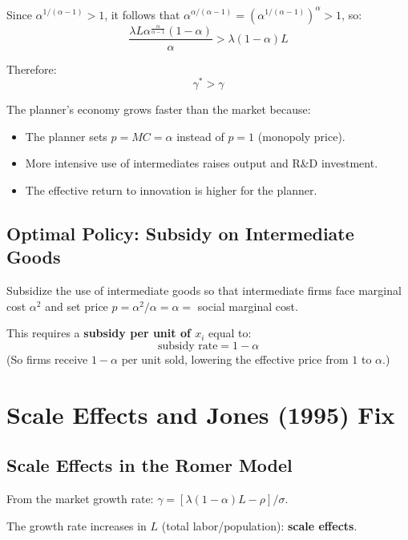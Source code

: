 \documentclass[a4paper,11pt]{article}
\begin{document}
Since $\alpha^{1/(\alpha-1)} > 1$, it follows that $\alpha^{\alpha/(\alpha-1)} = (\alpha^{1/(\alpha-1)})^\alpha > 1$, so:
\[
\frac{\lambda L \alpha^{\frac{\alpha}{\alpha-1}}(1-\alpha)}{\alpha} > \lambda(1-\alpha)L
\]

Therefore:
\[
\gamma^* > \gamma
\]

The planner's economy grows faster than the market because:
\begin{itemize}
    \item The planner sets $p = MC = \alpha$ instead of $p = 1$ (monopoly price).
    \item More intensive use of intermediates raises output and R\&D investment.
    \item The effective return to innovation is higher for the planner.
\end{itemize}

\subsection*{Optimal Policy: Subsidy on Intermediate Goods}

\begin{keyformulabox}
Subsidize the use of intermediate goods so that intermediate firms face marginal cost $\alpha^2$ and set price $p = \alpha^2/\alpha = \alpha = $ social marginal cost.

This requires a \textbf{subsidy per unit of $x_i$} equal to:
\[
\boxed{\text{subsidy rate} = 1 - \alpha}
\]
(So firms receive $1 - \alpha$ per unit sold, lowering the effective price from $1$ to $\alpha$.)
\end{keyformulabox}

\clearpage

\section{Scale Effects and Jones (1995) Fix}

\subsection*{Scale Effects in the Romer Model}

From the market growth rate: $\gamma = [\lambda(1-\alpha)L - \rho]/\sigma$.

The growth rate increases in $L$ (total labor/population): \textbf{scale effects}.
\end{document}
